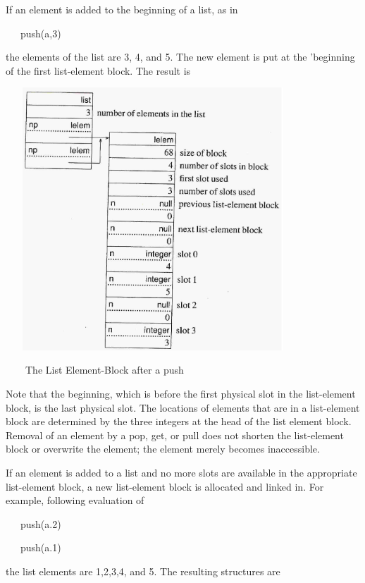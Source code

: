 If an element is added to the beginning of a list, as in

{\ttfamily\mdseries
\ \ \ push(a,3)}

\noindent the elements of the list are 3, 4, and 5. The new element is
put at the '{\textquotedbl}beginning{\textquotedbl} of the first
list-element block. The result is

\ \  \includegraphics[width=4.0602in,height=3.8791in]{ib-img/ib-img029.jpg} 

\ \ \ \ The List Element-Block after a push

Note that the {\textquotedbl}beginning,{\textquotedbl} which is before
the first physical slot in the list-element block, is the last
physical slot. The locations of elements that are in a list-element
block are determined by the three integers at the head of the list
element block. {\textquotedbl}Removal{\textquotedbl} of an element by
a pop, get, or pull does not shorten the list-element block or
overwrite the element; the element merely becomes inaccessible.

If an element is added to a list and no more slots are available in
the appropriate list-element block, a new list-element block is
allocated and linked in. For example, following evaluation of

{\ttfamily\mdseries
\ \ \ push(a.2)}

{\ttfamily\mdseries
\ \ \ push(a.1)}

\noindent the list elements are 1,2,3,4, and 5. The resulting structures are


